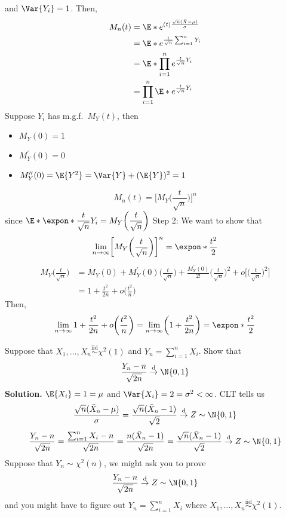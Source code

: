 and $ \Var{Y_i}=1 $. Then,
\begin{align*}
    M_n(t)
     & =\E*{e^{(t)\frac{\sqrt{n}(\bar{X}-\mu)}{\sigma}}} \\
     & =\E*{e^{\frac{t}{\sqrt{n}} \sum_{i=1}^{n} Y_i}}   \\
     & =\E*{\prod_{i=1}^n e^{\frac{t}{\sqrt{n}} Y_i}}    \\
     & =\prod_{i=1}^n\E*{e^{\frac{t}{\sqrt{n}} Y_i}}     \\
\end{align*}
Suppose $ Y_i $ has m.g.f.\ $ M_Y(t) $, then
\begin{itemize}
    \item $ M_Y(0)=1 $
    \item $ M_Y^\prime(0)=0 $
    \item $ M_Y^{\prime\prime}(0)=\E{Y^2}=\Var{Y}+(\E{Y})^2=1 $
\end{itemize}
\[ M_n(t)=\biggl[M_Y\biggl( \frac{t}{\sqrt{n}} \biggr)\biggr]^n \]
since $
    \displaystyle \E*{\expon*{\frac{t}{\sqrt{n}}Y_i}}=M_Y\biggl(\frac{t}{\sqrt{n}}\biggr) $
Step 2: We want to show that
\[ \lim\limits_{{n} \to {\infty}}
    \biggl[M_Y\biggl(\frac{t}{\sqrt{n}} \biggr)\biggr]^n=\expon*{\frac{t^2}{2}} \]
\begin{align*}
    M_Y\biggl(\frac{t}{\sqrt{n}} \biggr)
     & =M_Y(0)+M_Y^\prime(0)\biggl(\frac{t}{\sqrt{n}} \biggr)+
    \frac{M_Y^{\prime\prime}(0)}{2!}\biggl(\frac{t}{\sqrt{n}} \biggr)^2
    +o\biggl[\biggl(\frac{t}{\sqrt{n}} \biggr)^2\biggr]        \\
     & =1+\frac{t^2}{2n} +o\biggl(\frac{t^2}{n}\biggr)
\end{align*}
Then,
\[ \lim\limits_{{n} \to {\infty}}1+\frac{t^2}{2n} +o\biggl(\frac{t^2}{n}\biggr)=
    \lim\limits_{{n} \to {\infty}} \biggl(1+\frac{t^2}{2n}\biggr)=\expon*{\frac{t^2}{2}}  \]
\begin{Example}{}{}
    Suppose that $ X_1,\ldots,X_n \stackrel{\text{iid}}{\sim} \chi^2(1) $
    and $ Y_n=\sum_{i=1}^{n} X_i $. Show that
    \[ \frac{Y_n-n}{\sqrt{2n}} \stackrel{\text{d}}{\to}\N{0,1} \]
    \textbf{Solution.} $ \E{X_i}=1=\mu $ and $ \Var{X_i}=2=\sigma^2<\infty $.
    CLT tells us
    \[ \frac{\sqrt{n}(\bar{X}_n-\mu)}{\sigma}=
        \frac{\sqrt{n}(\bar{X}_n-1)}{\sqrt{2}}\stackrel{\text{d}}{\to}Z\sim \N{0,1} \]
    \[ \frac{Y_n-n}{\sqrt{2n}}=
        \frac{\sum_{i=1}^{n} X_i-n}{\sqrt{2n}}=\frac{n(\bar{X}_n-1)}{\sqrt{2n}}
        =\frac{\sqrt{n}(\bar{X}_n-1)}{\sqrt{2}}\stackrel{\text{d}}{\to}Z\sim\N{0,1}  \]
    Suppose that $ Y_n \sim \chi^2(n) $, we might ask you to prove
    \[ \frac{Y_n-n}{\sqrt{2n}} \stackrel{\text{d}}{\to}Z\sim \N{0,1} \]
    and you might have to figure out $ Y_n=\sum_{i=1}^{n} X_i $
    where $ X_1,\ldots,X_n\stackrel{\text{iid}}{\sim}\chi^2(1) $.
\end{Example}
